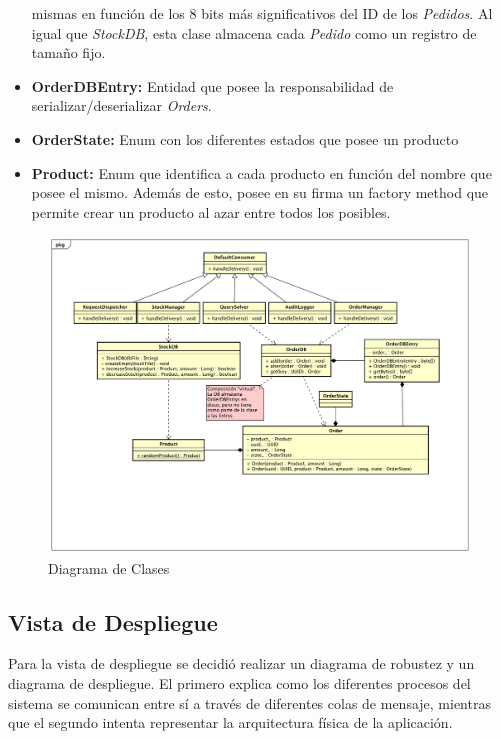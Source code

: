 \begin{itemize}
            mismas en función de los 8 bits más significativos del ID de los
            \textit{Pedidos}. Al igual que \textit{StockDB}, esta clase 
            almacena cada \textit{Pedido} como un registro de tamaño fijo.
            \item \textbf{OrderDBEntry:} Entidad que posee la responsabilidad
            de serializar/deserializar \textit{Orders}.
            \item \textbf{OrderState:} Enum con los diferentes estados que 
            posee un producto
            \item \textbf{Product:} Enum que identifica a cada producto en
            función del nombre que posee el mismo. Además de esto, posee en
            su firma un factory method que permite crear un producto al azar
            entre todos los posibles.
    
        \end{itemize}
 
        \newpage
        \begin{figure}[!Hhtb]                                             
            \centering                                                   
            \includegraphics[width=18cm,angle=90,origin=c]{Imagenes/Diagrama_Clases.pdf} 
            \caption{Diagrama de Clases} \label{DiagClases}
        \end{figure}

    \newpage
    \subsection{Vista de Despliegue}
        Para la vista de despliegue se decidió realizar un diagrama de 
        robustez y un diagrama de despliegue. El primero explica como los 
        diferentes procesos del sistema se comunican entre sí a través de 
        diferentes colas de mensaje, mientras que el segundo intenta representar
        la arquitectura física de la aplicación.
        
